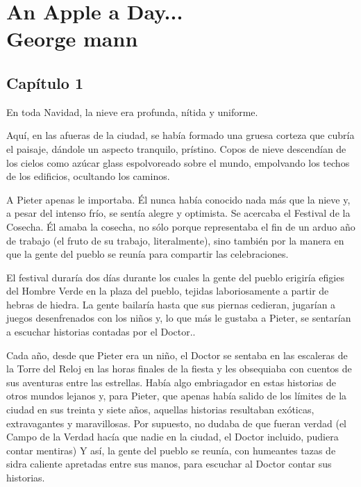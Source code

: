 \part*{An Apple a Day... \\ \vspace{2 mm} {\large George mann}}

\chapter*{Capítulo 1}

En toda Navidad, la nieve era profunda, nítida y uniforme.



Aquí, en las afueras de la ciudad, se había formado una gruesa corteza que cubría el paisaje, dándole un aspecto tranquilo, prístino. Copos de nieve descendían de los cielos como azúcar glass espolvoreado sobre el mundo, empolvando los techos de los edificios, ocultando los caminos.



A Pieter apenas le importaba. Él nunca había conocido nada más que la nieve y, a pesar del intenso frío, se sentía alegre y optimista. Se acercaba el Festival de la Cosecha. Él amaba la cosecha, no sólo porque representaba el fin de un arduo año de trabajo (el fruto de su trabajo, literalmente), sino también por la manera en que la gente del pueblo se reunía para compartir las celebraciones.



El festival duraría dos días durante los cuales la gente del pueblo erigiría efigies del Hombre Verde en la plaza del pueblo, tejidas laboriosamente a partir de hebras de hiedra. La gente bailaría hasta que sus piernas cedieran, jugarían a juegos desenfrenados con los niños y, lo que más le gustaba a Pieter, se sentarían a escuchar historias contadas por el Doctor..



Cada año, desde que Pieter era un niño, el Doctor se sentaba en las escaleras de la Torre del Reloj en las horas finales de la fiesta y les obsequiaba con cuentos de sus aventuras entre las estrellas. Había algo embriagador en estas historias de otros mundos lejanos y, para Pieter, que apenas había salido de los límites de la ciudad en sus treinta y siete años, aquellas historias resultaban exóticas, extravagantes y maravillosas. Por supuesto, no dudaba de que fueran verdad (el Campo de la Verdad hacía que nadie en la ciudad, el Doctor incluido, pudiera contar mentiras) Y así, la gente del pueblo se reunía, con humeantes tazas de sidra caliente apretadas entre sus manos, para escuchar al Doctor contar sus historias.



